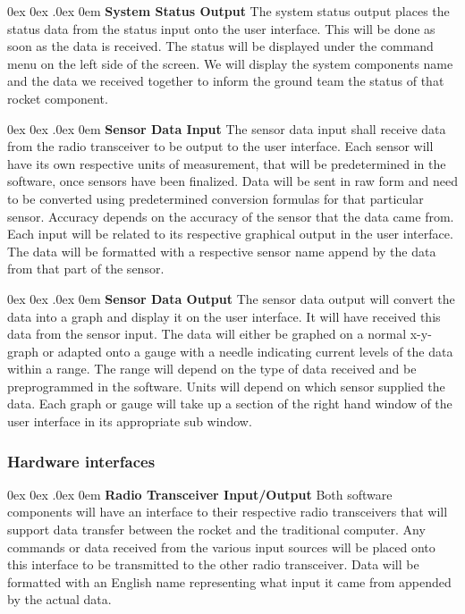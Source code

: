 \documentclass[10pt,draftclsnofoot,onecolumn,compsoc]{IEEEtran}
\makeatletter
\renewcommand\paragraph{\@startsection{paragraph}{4}{\z@}%
                                    {0ex \@plus0ex \@minus.0ex}%
                                    {0em}%
                                    {\normalfont\normalsize\bfseries}}
\makeatother
\begin{document}
\paragraph{\bf System Status Output}
The system status output places the status data from the status input onto the user interface. This will be done as soon as the data is received. The status will be displayed under the command menu on the left side of the screen. We will display the system components name and the data we received together to inform the ground team the status of that rocket component.

\paragraph{\bf Sensor Data Input}
The sensor data input shall receive data from the radio transceiver to be output to the user interface. Each sensor will have its own respective units of measurement, that will be predetermined in the software, once sensors have been finalized. Data will be sent in raw form and need to be converted using predetermined conversion formulas for that particular sensor. Accuracy depends on the accuracy of the sensor that the data came from. Each input will be related to its respective graphical output in the user interface. The data will be formatted with a respective sensor name append by the data from that part of the sensor.

\paragraph{\bf Sensor Data Output}
The sensor data output will convert the data into a graph and display it on the user interface. It will have received this data from the sensor input. The data will either be graphed on a normal x-y-graph or adapted onto a gauge with a needle indicating current levels of the data within a range. The range will depend on the type of data received and be preprogrammed in the software. Units will depend on which sensor supplied the data. Each graph or gauge will take up a section of the right hand window of the user interface in its appropriate sub window. 


\subsubsection{Hardware interfaces }
\paragraph{\bf Radio Transceiver Input/Output}
		Both software components will have an interface to their respective radio transceivers that will support data transfer between the rocket and the traditional computer. Any commands or data received from the various input sources will be placed onto this interface to be transmitted to the other radio transceiver. Data will be formatted with an English name representing what input it came from appended by the actual data.
\end{document}
